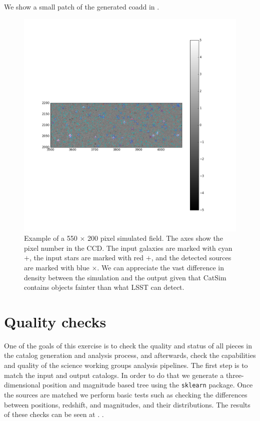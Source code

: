 \documentclass[\docopts]{\docclass}
\begin{document}
We show a small patch of the generated coadd in .

\begin{figure}
\centering
\includegraphics[width=0.9\columnwidth]{field.png}
\caption{Example of a 550 $\times$ 200 pixel simulated field. The axes show the pixel number in the CCD. The input galaxies are marked with cyan $+$, the input stars are marked with red $+$, and the detected sources are marked with blue $\times$. We can appreciate the vast difference in density between the simulation and the output given that CatSim contains objects fainter than what LSST can detect.}
\label{fig:coadd_example}
\end{figure}

\section{Quality checks}
\label{sec:quality}

One of the goals of this exercise is to check the quality and status of all pieces in the catalog generation and analysis process, and afterwards, check the capabilities and quality of the science working groups analysis pipelines. The first step is to match the input and output catalogs. In order to do that we generate a three-dimensional position and magnitude based tree using the \texttt{sklearn} package. Once the sources are matched we perform basic tests such as checking the differences between positions, redshift, and magnitudes, and their distributions. The results of these checks can be seen at . .
\end{document}
